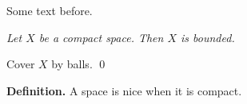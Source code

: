 \documentclass{article}
\begin{document}
Some text before.

\medskip{} {\it Let $X$ be a compact space. Then $X$ is bounded.}

 Cover $X$ by balls. \qed

\noindent\textbf{Definition.} A space is nice when it is compact.
\end{document}
